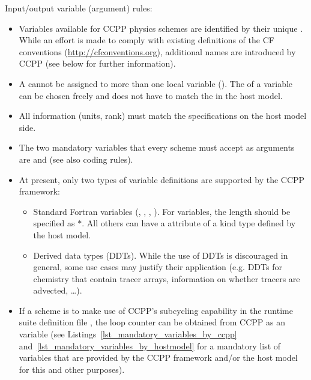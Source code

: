 Input/output variable (argument) rules:
\begin{itemize}
\item Variables available for CCPP physics schemes are identified by their unique . While an effort is made to comply with existing  definitions of the CF conventions (\url{http://cfconventions.org}), additional names are introduced by CCPP (see below for further information).
\item A  cannot be assigned to more than one local variable (). The  of a variable can be chosen freely and does not have to match the  in the host model.
\item All information (units, rank) must match the specifications on the host model side.
\item The two mandatory variables that every scheme must accept as  arguments are  and  (see also coding rules).
\item At present, only two types of variable definitions are supported by the CCPP framework:
\begin{itemize}
\item Standard Fortran variables (, , , ). For  variables, the length should be specified as $\ast$. All others can have a  attribute of a kind type defined by the host model.
\item Derived data types (DDTs). While the use of DDTs is discouraged in general, some use cases may justify their application (e.g. DDTs for chemistry that contain tracer arrays, information on whether tracers are advected, \dots).
\end{itemize}
\item If a scheme is to make use of CCPP's subcycling capability in the runtime suite definition file , the loop counter can be obtained from CCPP as an  variable (see Listings~\ref{lst_mandatory_variables_by_ccpp} and~\ref{lst_mandatory_variables_by_hostmodel} for a mandatory list of variables that are provided by the CCPP framework and/or the host model for this and other purposes).
\end{itemize}

